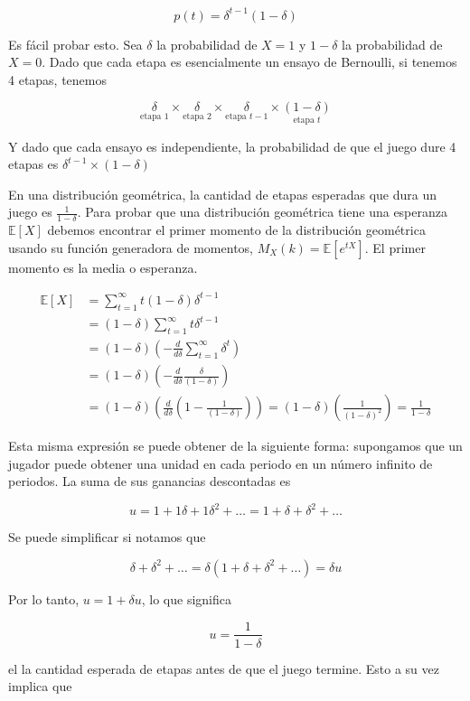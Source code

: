 \documentclass[12pt]{scrartcl}
\begin{document}
\[ 
    p(t)=\delta^{t-1}(1-\delta)
\]

Es fácil probar esto. Sea $ \delta $ la probabilidad de $ X = 1 $ y $1-\delta$ la probabilidad de $ X = 0 $. Dado que cada etapa es esencialmente un ensayo de Bernoulli, si tenemos 4 etapas, tenemos 

\[
	\underset{\text{etapa 1}}{\delta} \times \underset{\text{etapa 2}}{\delta}\times \underset{\text{etapa } t - 1}{\delta}\times \underset{\text{etapa } t}{(1-\delta)}
\]

Y dado que cada ensayo es independiente, la probabilidad de que el juego dure 4 etapas es $ \delta^{t-1}\times(1-\delta) $

En una distribución geométrica, la cantidad de etapas esperadas que dura un juego es $\frac{1}{1-\delta}$. Para probar que una distribución geométrica tiene una esperanza $ \mathbb{E}[X] $ debemos encontrar el primer momento de la distribución geométrica usando su función generadora de momentos, $ M_X(k) = \mathbb{E}[e^{tX}]$. El primer momento es la media o esperanza.

\begin{align*}
	\mathbb{E}[X]&=\sum_{t=1}^{\infty}t(1-\delta)\delta^{t-1} \\
	&=(1-\delta)\sum_{t=1}^{\infty}t\delta^{t-1} \\
	&=(1-\delta)\left(-\frac{d}{d\delta}\sum_{t=1}^{\infty}\delta^t\right) \\
	&=(1-\delta)\left(-\frac{d}{d\delta}\frac{\delta}{(1-\delta)}\right) \\
	&=(1-\delta)\left(\frac{d}{d\delta}\left(1-\frac{1}{(1-\delta)}\right)\right)=(1-\delta)\left(\frac{1}{(1-\delta)^2}\right)=\frac{1}{1-\delta}
\end{align*}

Esta misma expresión se puede obtener de la siguiente forma: supongamos que un jugador puede obtener una unidad en cada periodo en un número infinito de periodos. La suma de sus ganancias descontadas es

\[ 
u = 1 + 1\delta + 1\delta^2 + \dots = 1 + \delta + \delta^2 + \dots
\]

Se puede simplificar si notamos que

\[ 
    \delta + \delta^2 + \dots = \delta(1 + \delta + \delta^2 + \dots) = \delta u
\]

Por lo tanto, $u=1+\delta u$, lo que significa 

\[u = \frac{1}{1-\delta} \]

el la cantidad esperada de etapas antes de que el juego termine. Esto a su vez implica que
\end{document}
